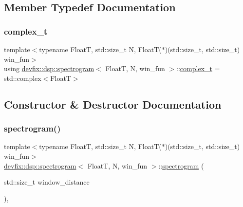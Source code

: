 \subsection{Member Typedef Documentation}
\mbox{\label{structdevfix_1_1dsp_1_1spectrogram_a920fdda446509cfe81fa287773c709cb}} 
\subsubsection{\texorpdfstring{complex\+\_\+t}{complex\_t}}
{\footnotesize\ttfamily template$<$typename FloatT, std\+::size\+\_\+t N, Float\+T($\ast$)(std\+::size\+\_\+t, std\+::size\+\_\+t) win\+\_\+fun$>$ \\
using \hyperlink{structdevfix_1_1dsp_1_1spectrogram}{devfix\+::dsp\+::spectrogram}$<$ FloatT, N, win\+\_\+fun $>$\+::\hyperlink{structdevfix_1_1dsp_1_1spectrogram_a920fdda446509cfe81fa287773c709cb}{complex\+\_\+t} =  std\+::complex$<$FloatT$>$}



\subsection{Constructor \& Destructor Documentation}
\mbox{\label{structdevfix_1_1dsp_1_1spectrogram_ad1d11586447533319ec37e5e9de6e6e9}} 
\subsubsection{\texorpdfstring{spectrogram()}{spectrogram()}}
{\footnotesize\ttfamily template$<$typename FloatT, std\+::size\+\_\+t N, Float\+T($\ast$)(std\+::size\+\_\+t, std\+::size\+\_\+t) win\+\_\+fun$>$ \\
\hyperlink{structdevfix_1_1dsp_1_1spectrogram}{devfix\+::dsp\+::spectrogram}$<$ FloatT, N, win\+\_\+fun $>$\+::\hyperlink{structdevfix_1_1dsp_1_1spectrogram}{spectrogram} (\begin{DoxyParamCaption}\item[{std\+::size\+\_\+t}]{window\+\_\+distance }\end{DoxyParamCaption})\hspace{0.3cm}{\ttfamily [inline]}, {\ttfamily [explicit]}}



